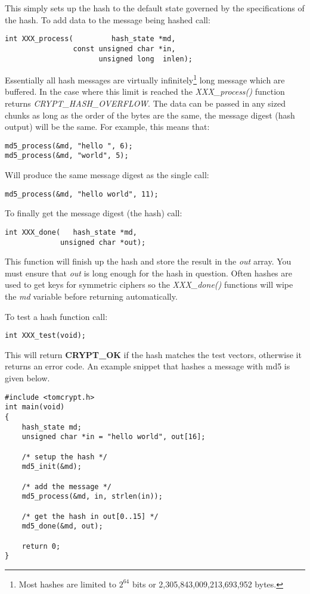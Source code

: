 \documentclass[synpaper]{book}
\begin{document}
This simply sets up the hash to the default state governed by the specifications of the hash.  To add data to the message being hashed call:
\begin{verbatim}
int XXX_process(         hash_state *md,
                const unsigned char *in,
                      unsigned long  inlen);
\end{verbatim}
Essentially all hash messages are virtually infinitely\footnote{Most hashes are limited to $2^{64}$ bits or 2,305,843,009,213,693,952 bytes.} long message which
are buffered.  In the case where this limit is reached the \textit{XXX\_process()} function returns \textit{CRYPT\_HASH\_OVERFLOW}.
The data can be passed in any sized chunks as long as the order of the bytes are the same, the message digest (hash output) will be the same.  For example, this means that:
\begin{verbatim}
md5_process(&md, "hello ", 6);
md5_process(&md, "world", 5);
\end{verbatim}
Will produce the same message digest as the single call:
\begin{verbatim}
md5_process(&md, "hello world", 11);
\end{verbatim}

To finally get the message digest (the hash) call:
\begin{verbatim}
int XXX_done(   hash_state *md,
             unsigned char *out);
\end{verbatim}

This function will finish up the hash and store the result in the \textit{out} array.  You must ensure that \textit{out} is long
enough for the hash in question.  Often hashes are used to get keys for symmetric ciphers so the \textit{XXX\_done()} functions
will wipe the \textit{md} variable before returning automatically.

To test a hash function call:
\begin{verbatim}
int XXX_test(void);
\end{verbatim}

This will return {\bf CRYPT\_OK} if the hash matches the test vectors, otherwise it returns an error code.  An
example snippet that hashes a message with md5 is given below.
\begin{small}
\begin{verbatim}
#include <tomcrypt.h>
int main(void)
{
    hash_state md;
    unsigned char *in = "hello world", out[16];

    /* setup the hash */
    md5_init(&md);

    /* add the message */
    md5_process(&md, in, strlen(in));

    /* get the hash in out[0..15] */
    md5_done(&md, out);

    return 0;
}
\end{verbatim}
\end{small}
\end{document}
